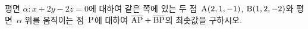 평면 $\alpha\colon x+2y-2z=0$에 대하여 같은 쪽에 있는 두 점~$\mathrm{A}(2{,}\mkern3mu\mathopen{}1{,}\mkern3mu\mathopen{}-1)$, $\mathrm{B}(1{,}\mkern3mu\mathopen{}2{,}\mkern3mu\mathopen{}-2)$와 평면~$\alpha$ 위를 움직이는 점~$\mathrm{P}$에 대하여 $\overline{\mathrm{AP}}+\overline{\mathrm{BP}}$의 최솟값을 구하시오.
